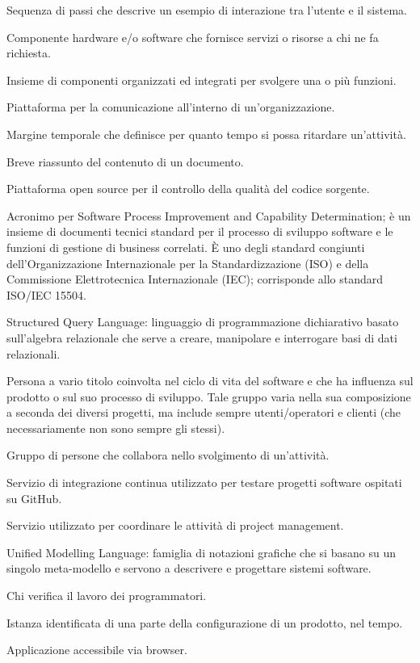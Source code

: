 \item[Scenario] Sequenza di passi che descrive un esempio di interazione tra l'utente e il sistema.
\item[Server] Componente hardware e/o software che fornisce servizi o risorse a chi ne fa richiesta.
\item[Sistema] Insieme di componenti organizzati ed integrati per svolgere una o più funzioni.
\item[Slack ] Piattaforma per la comunicazione all'interno di un'organizzazione.
\item[Slack, periodo di] Margine temporale che definisce per quanto tempo si possa ritardare un’attività.
\item[sommario] Breve riassunto del contenuto di un documento.
\item[SonarQube] Piattaforma open source per il controllo della qualità del codice sorgente.
\item[SPICE] Acronimo per Software Process Improvement and Capability Determination; è un insieme di documenti tecnici standard per il processo di sviluppo software e le funzioni di gestione di business correlati. È uno degli standard congiunti dell’Organizzazione Internazionale per la Standardizzazione (ISO) e della Commissione Elettrotecnica Internazionale (IEC); corrisponde allo standard ISO/IEC 15504.
\item[SQL] Structured Query Language: linguaggio di programmazione dichiarativo basato sull'algebra relazionale che serve a creare, manipolare e interrogare basi di dati relazionali.
\item[Stakeholder] Persona a vario titolo coinvolta nel ciclo di vita del software e che ha influenza sul prodotto o sul suo processo di sviluppo. Tale gruppo varia nella sua composizione a seconda dei diversi progetti, ma include sempre utenti/operatori e clienti (che necessariamente non sono sempre gli stessi).
\item[Team] Gruppo di persone che collabora nello svolgimento di un’attività.
\item[Travis] Servizio di integrazione continua utilizzato per testare progetti software ospitati su GitHub.
\item[Trello] Servizio utilizzato per coordinare le attività di project management.
\item[UML] Unified Modelling Language: famiglia di notazioni grafiche che si basano su un singolo meta-modello e servono a descrivere e progettare sistemi software.
\item[verificatore] Chi verifica il lavoro dei programmatori.
\item[versione] Istanza identificata di una parte della configurazione di un prodotto, nel tempo.
\item[Web Application] Applicazione accessibile via browser.
